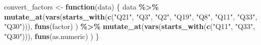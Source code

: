 \documentclass[12pt,twoside]{reedthesis}
\newenvironment{Shaded}{\begin{snugshade}}{\end{snugshade}}
\newcommand{\ControlFlowTok}[1]{\textcolor[rgb]{0.13,0.29,0.53}{\textbf{#1}}}
\newcommand{\KeywordTok}[1]{\textcolor[rgb]{0.13,0.29,0.53}{\textbf{#1}}}
\newcommand{\NormalTok}[1]{#1}
\newcommand{\OperatorTok}[1]{\textcolor[rgb]{0.81,0.36,0.00}{\textbf{#1}}}
\newcommand{\StringTok}[1]{\textcolor[rgb]{0.31,0.60,0.02}{#1}}
\begin{document}
\begin{Shaded}
\begin{Highlighting}[]
\NormalTok{convert\_factors \textless{}{-}}\StringTok{ }\ControlFlowTok{function}\NormalTok{(data) \{}
\NormalTok{  data }\OperatorTok{\%\textgreater{}\%}
\StringTok{    }\KeywordTok{mutate\_at}\NormalTok{(}\KeywordTok{vars}\NormalTok{(}\KeywordTok{starts\_with}\NormalTok{(}\KeywordTok{c}\NormalTok{(}\StringTok{"Q21"}\NormalTok{, }\StringTok{"Q3"}\NormalTok{, }\StringTok{"Q2"}\NormalTok{, }\StringTok{"Q19"}\NormalTok{, }\StringTok{"Q8"}\NormalTok{, }\StringTok{"Q11"}\NormalTok{, }\StringTok{"Q33"}\NormalTok{, }\StringTok{"Q30"}\NormalTok{))), }
              \KeywordTok{funs}\NormalTok{(factor)}
\NormalTok{    ) }\OperatorTok{\%\textgreater{}\%}
\StringTok{    }\KeywordTok{mutate\_at}\NormalTok{(}\KeywordTok{vars}\NormalTok{(}\KeywordTok{starts\_with}\NormalTok{(}\KeywordTok{c}\NormalTok{(}\StringTok{"Q11"}\NormalTok{, }\StringTok{"Q33"}\NormalTok{, }\StringTok{"Q30"}\NormalTok{))), }
              \KeywordTok{funs}\NormalTok{(as.numeric)}
\NormalTok{    )}
\NormalTok{\}}


\end{Highlighting}
\end{Shaded}
\end{document}
